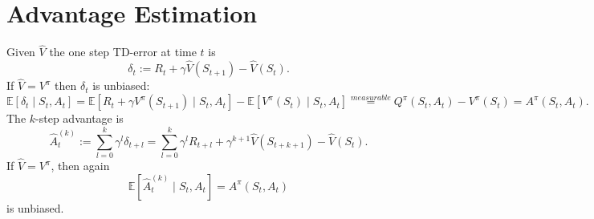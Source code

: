\documentclass[../main.tex]{subfiles}  %
\begin{document}
\section{Advantage Estimation}
Given $\hat{V}$ the one step TD-error at time $t$ is 
\[
\delta_t := R_t + \gamma \hat{V} (S_{t+1}) - \hat{V} (S_t).
\]
If $\hat{V} = V^\pi$ then $\delta_t$ is unbiased:
\[
\mathbb{E}[\delta_t \mid S_t,A_t] = \mathbb{E}[R_t + \gamma V^\pi (S_{t+1}) \mid S_t,A_t] - \mathbb{E}[ V^\pi (S_t) \mid S_t,A_t] \stackrel{measurable}{=} Q^\pi (S_t,A_t) -V^\pi (S_t) =A^\pi (S_t,A_t).
\]
The $k$-step advantage is 
\[
\hat{A}_t^{(k)} := \sum_{l=0}^k \gamma^l \delta_{t+l} = \sum_{l=0}^k \gamma^l R_{t+l} + \gamma^{k+1} \hat{V} (S_{t+k+1}) - \hat{V} (S_t).
\]
If $\hat{V} = V^\pi$, then again 
\[
\mathbb{E}[\hat{A}_t^{(k)}  \mid S_t,A_t] =A^\pi (S_t,A_t)    
\]
is unbiased. 
\end{document}
